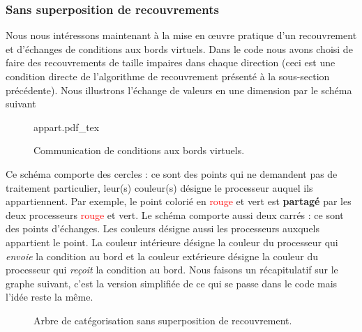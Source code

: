 \documentclass[a4paper,11pt]{article}
\newcommand{\incfig}[2]{%
	\def\svgwidth{#1\textwidth}
	\centering
	{#2.pdf_tex}
}
\begin{document}
\subsubsection{Sans superposition de recouvrements}
\noindent Nous nous intéressons maintenant à la mise en \oe uvre pratique d'un recouvrement et d'échanges de conditions aux bords virtuels. Dans le code nous avons choisi de faire des recouvrements de taille impaires dans chaque direction (ceci est une condition directe de l'algorithme de recouvrement présenté à la sous-section précédente). Nous illustrons l'échange de valeurs en une dimension par le schéma suivant
\begin{figure}[H]
	\incfig{0.6}{appart}
	\caption{Communication de conditions aux bords virtuels.}
\end{figure}
\noindent Ce schéma comporte des cercles : ce sont des points qui ne demandent pas de traitement particulier, leur(s) couleur(s) désigne le processeur auquel ils appartiennent. Par exemple, le point colorié en \textcolor{red}{rouge} et \textcolor[RGB]{0, 140, 0}{vert}  est \textbf{partagé} par les deux processeurs \textcolor{red}{rouge} et \textcolor[RGB]{0, 140, 0}{vert}. Le schéma comporte aussi deux carrés : ce sont des points d'échanges. Les couleurs désigne aussi les processeurs auxquels appartient le point. La couleur intérieure désigne la couleur du processeur qui \textit{envoie} la condition au bord et la couleur extérieure désigne la couleur du processeur qui \textit{reçoit} la condition au bord. Nous faisons un récapitulatif sur le graphe suivant, c'est la version simplifiée de ce qui se passe dans le code mais l'idée reste la même.
\begin{figure}[H]
	\centering
	\caption{Arbre de catégorisation sans superposition de recouvrement.}
\end{figure}
\end{document}
